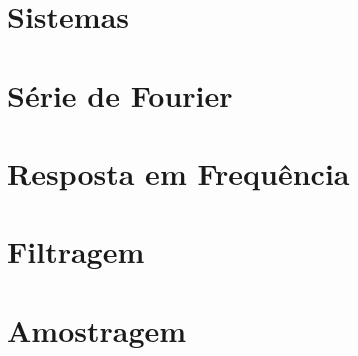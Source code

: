 \documentclass[a4paper, 12pt]{article}
\begin{document}
\section{Sistemas}
\newpage
\section{Série de Fourier}
\newpage
\section{Resposta em Frequência}
\newpage
\section{Filtragem}
\newpage
\section{Amostragem}
\end{document}
